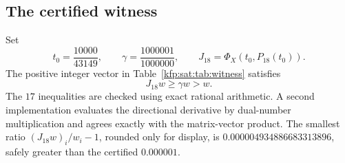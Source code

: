 \documentclass[11pt,a4paper]{article}
\theoremstyle{definition}
\theoremstyle{remark}
\begin{document}
\subsection{The certified witness}
Set
\begin{equation}\label{kfp:sat:eq:bui-t}
 t_0=\frac{10000}{43149},\qquad
 \gamma=\frac{1000001}{1000000},\qquad
 J_{18}=\Phi_X(t_0,P_{18}(t_0)).
\end{equation}
The positive integer vector in Table~\ref{kfp:sat:tab:witness} satisfies
\begin{equation}\label{kfp:sat:eq:bui-check}
 \boxed{J_{18}w\ge\gamma w>w.}
\end{equation}
The $17$ inequalities are checked using exact rational arithmetic. A
second implementation evaluates the directional derivative by dual-number
multiplication and agrees exactly with the matrix-vector product. The
smallest ratio $(J_{18}w)_i/w_i-1$, rounded only for display, is
$0.000004934886683313896$, safely greater than the certified
$0.000001$.

\begin{table}[htbp]
\centering\small

\caption{An integer witness for~\eqref{kfp:sat:eq:bui-check}. The column headed
$w_i$ is a vector entry, not the map coordinate named $w$.}
\label{kfp:sat:tab:witness}
\end{table}
\end{document}
